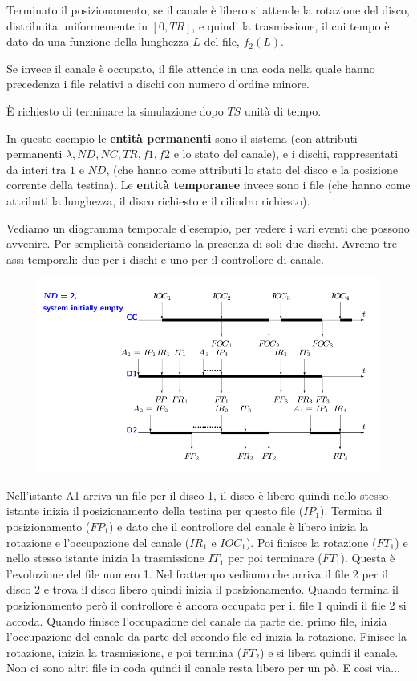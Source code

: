 \documentclass[11pt]{book}
\begin{document}
Terminato il posizionamento, se il canale \`e libero si attende la
rotazione del disco, distribuita uniformemente in $[0,TR]$, e quindi
la trasmissione, il cui tempo \`e dato da una funzione della lunghezza
$L$ del file, $f_2(L)$.

Se invece il canale \`e occupato, il file attende in una coda nella
quale hanno precedenza i file relativi a dischi con numero d'ordine
minore. 

\`E richiesto di terminare la simulazione dopo $TS$ unit\`a di tempo.

In questo esempio le {\bf entit\`a permanenti} sono il sistema (con
attributi permanenti $\lambda, ND, NC, TR, f1, f2$ e lo stato del
canale), e i dischi, rappresentati da interi tra $1$ e $ND$, (che
hanno come attributi lo stato del disco e la posizione corrente della
testina). Le {\bf entit\`a temporanee} invece sono i file (che hanno
come attributi la lunghezza, il disco richiesto e il cilindro
richiesto).

Vediamo un diagramma temporale d'esempio, per vedere i vari eventi che
possono avvenire. Per semplicit\`a consideriamo la presenza di soli due
dischi. Avremo tre assi temporali: due per i dischi e uno per il
controllore di canale.

\begin{figure}[H]
  \centering
  \includegraphics[width=\textwidth]{images/cap11fig24.png}
\end{figure}

Nell'istante A1 arriva un file per il disco 1, il disco \`e libero
quindi nello stesso istante inizia il posizionamento della testina per
questo file ($IP_1$). Termina il posizionamento ($FP_1$) e dato che il
controllore del canale \`e libero inizia la rotazione e l'occupazione
del canale ($IR_1$ e $IOC_1$). Poi finisce la rotazione ($FT_1$) e
nello stesso istante inizia la trasmissione $IT_1$ per poi terminare
($FT_1$). Questa \`e l'evoluzione del file numero 1. Nel frattempo
vediamo che arriva il file 2 per il disco 2 e trova il disco libero
quindi inizia il posizionamento. Quando termina il posizionamento
per\`o il controllore \`e ancora occupato per il file 1 quindi il file 2
si accoda. Quando finisce l'occupazione del canale da parte del primo
file, inizia l'occupazione del canale da parte del secondo file ed
inizia la rotazione. Finisce la rotazione, inizia la trasmissione, e
poi termina ($FT_2$) e si libera quindi il canale. Non ci sono altri
file in coda quindi il canale resta libero per un p\`o. E cos\`i via...
\end{document}
